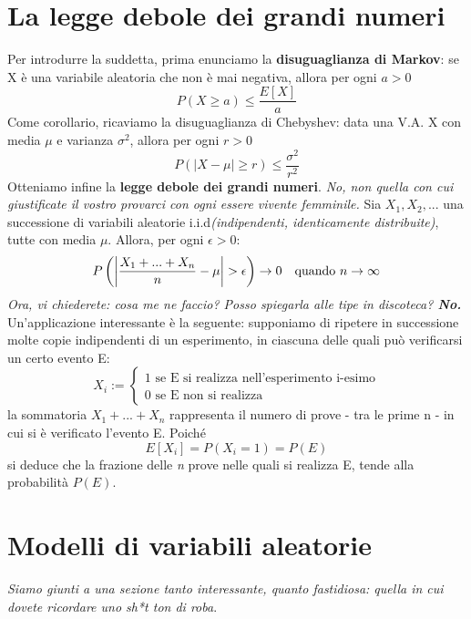 \documentclass[11pt]{article}
\begin{document}
\section{La legge debole dei grandi numeri}
Per introdurre la suddetta, prima enunciamo la \textbf{disuguaglianza di Markov}: se X è una variabile aleatoria che non è mai negativa, allora per ogni $a>0$
\begin{displaymath}
    P(X\ge a) \le \frac{E[X]}{a}
\end{displaymath}
Come corollario, ricaviamo la disuguaglianza di Chebyshev: data una V.A. X con media $\mu$ e varianza $\sigma^2$, allora per ogni $r>0$
\begin{displaymath}
    P(|X-\mu|\ge r) \le \frac{\sigma^2}{r^2}
\end{displaymath}
Otteniamo infine la \textbf{legge debole dei grandi numeri}. \textit{No, non quella con cui giustificate il vostro provarci con ogni essere vivente femminile.} Sia $X_1,X_2,...$ una successione di variabili aleatorie i.i.d\textit{(indipendenti, identicamente distribuite)}, tutte con media $\mu$. Allora, per ogni $\epsilon >0$:
\begin{displaymath}
    P\left(\left|\frac{X_1+...+X_n}{n} - \mu\right|>\epsilon \right)\rightarrow0\hspace{10px}\mbox{quando }n\rightarrow\infty
\end{displaymath}
\textit{Ora, vi chiederete: cosa me ne faccio? Posso spiegarla alle tipe in discoteca?\textbf{ No.}} Un'applicazione interessante è la seguente: supponiamo di ripetere in successione molte copie indipendenti di un esperimento, in ciascuna delle quali può verificarsi un certo evento E:
\begin{displaymath}
    X_i:=
    \begin{cases}
        1\mbox{ se E si realizza nell'esperimento i-esimo}\\ 
        0\mbox{ se E non si realizza}
    \end{cases}
\end{displaymath}
la sommatoria $X_1+...+X_n$ rappresenta il numero di prove - tra le prime n - in cui si è verificato l'evento E. Poiché 
\begin{displaymath}
    E[X_i]=P(X_i=1)=P(E)
\end{displaymath}
si deduce che la frazione delle \textit{n} prove nelle quali si realizza E, tende alla probabilità $P(E)$.
\section{Modelli di variabili aleatorie}
\textit{Siamo giunti a una sezione tanto interessante, quanto fastidiosa: quella in cui dovete ricordare uno sh*t ton di roba}.
\end{document}
